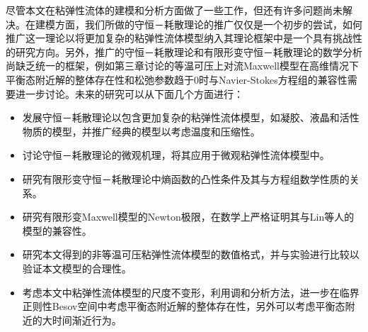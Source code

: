 尽管本文在粘弹性流体的建模和分析方面做了一些工作，但还有许多问题尚未解决。在建模方面，我们所做的守恒－耗散理论的推广仅仅是一个初步的尝试，如何推广这一理论以将更加复杂的粘弹性流体模型纳入其理论框架中是一个具有挑战性的研究方向。另外，推广的守恒－耗散理论和有限形变守恒－耗散理论的数学分析尚缺乏统一的框架，例如第三章讨论的等温可压上对流Maxwell模型在高维情况下平衡态附近解的整体存在性和松弛参数趋于$0$时与Navier-Stokes方程组的兼容性需要进一步讨论。未来的研究可以从下面几个方面进行：
\begin{itemize}
	\item 发展守恒－耗散理论以包含更加复杂的粘弹性流体模型，如凝胶、液晶和活性物质的模型，并推广经典的模型以考虑温度和压缩性。
	\item 讨论守恒－耗散理论的微观机理，将其应用于微观粘弹性流体模型中。
	\item 研究有限形变守恒－耗散理论中熵函数的凸性条件及其与方程组数学性质的关系。
	\item 研究有限形变Maxwell模型的Newton极限，在数学上严格证明其与Lin等人的模型的兼容性。	
	\item 研究本文得到的非等温可压粘弹性流体模型的数值格式，并与实验进行比较以验证本文模型的合理性。
	\item 考虑本文中粘弹性流体模型的尺度不变形，利用调和分析方法，进一步在临界正则性Besov空间中考虑平衡态附近解的整体存在性，另外可以考虑平衡态附近的大时间渐近行为。
\end{itemize}

% 
